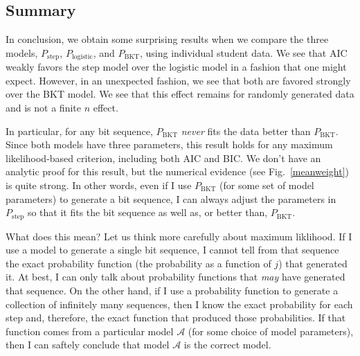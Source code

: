 \documentclass{acmlarge-edm}
\begin{document}
\subsection{Summary}

In conclusion, we obtain some surprising results when we compare
the three models,  $P_\mathrm{step}$, $P_\mathrm{logistic}$, and
$P_\mathrm{BKT}$, using individual student data.   We see that AIC
weakly favors the step model over the logistic model in a fashion that one might expect.
However, in an unexpected fashion, we see that both are favored
strongly over the BKT model.  We see that this effect remains for
randomly generated data and is not a finite $n$ effect.

In particular, for any bit sequence,  $P_\mathrm{BKT}$ {\em never}
fits the data better than $P_\mathrm{BKT}$.  Since 
both models have three parameters, this result holds for any maximum
likelihood-based criterion, including both AIC and BIC.  We don't have
an analytic proof for this result, 
but the numerical evidence (see Fig.~\ref{meanweight}) is quite strong.
In other words, even if I use $P_\mathrm{BKT}$ (for some set of model parameters) 
to generate a bit sequence, I can
always adjust the parameters in $P_\mathrm{step}$ so that it
fits the bit sequence as well as, or better than, $P_\mathrm{BKT}$.





What does this mean?  Let us think
more carefully about maximum liklihood.
If I use a model to generate a single bit sequence, I cannot tell from
that sequence the exact probability function (the probability as a
function of $j$) that generated it.  At best, I can only
talk about probability functions that {\em may} have generated that sequence.
On the other hand, if I use a probability function to generate a collection of infinitely many
sequences, then I know the exact probability for each step and, therefore, the exact function that
produced those probabilities.  If that function comes from a
particular model $\mathcal{A}$ (for some choice of model parameters),
 then I can saftely conclude that model $\mathcal{A}$ is the correct model.
\end{document}
